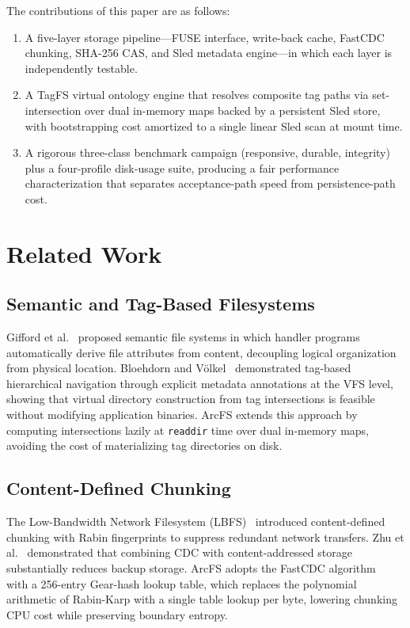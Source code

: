 \documentclass[conference]{IEEEtran}
\begin{document}
The contributions of this paper are as follows:
\begin{enumerate}
\item A five-layer storage pipeline—FUSE interface, write-back cache,
  FastCDC chunking, SHA-256 CAS, and Sled metadata engine—in which
  each layer is independently testable.
\item A TagFS virtual ontology engine that resolves composite tag paths
  via set-intersection over dual in-memory maps backed by a persistent
  Sled store, with bootstrapping cost amortized to a single linear Sled
  scan at mount time.
\item A rigorous three-class benchmark campaign (responsive, durable,
  integrity) plus a four-profile disk-usage suite, producing a fair
  performance characterization that separates acceptance-path speed from
  persistence-path cost.
\end{enumerate}

\section{Related Work}

\subsection{Semantic and Tag-Based Filesystems}

Gifford et al.~\cite{gifford1991semantic} proposed semantic file systems
in which handler programs automatically derive file attributes from content,
decoupling logical organization from physical location. Bloehdorn and
V\"{o}lkel~\cite{bloehdorn2006tagfs} demonstrated tag-based hierarchical
navigation through explicit metadata annotations at the VFS level, showing
that virtual directory construction from tag intersections is feasible
without modifying application binaries. ArcFS extends this approach by
computing intersections lazily at \texttt{readdir} time over dual in-memory
maps, avoiding the cost of materializing tag directories on disk.

\subsection{Content-Defined Chunking}

The Low-Bandwidth Network Filesystem (LBFS)~\cite{muthitacharoen2001lbfs}
introduced content-defined chunking with Rabin fingerprints to suppress
redundant network transfers. Zhu et al.~\cite{zhu2008dedup} demonstrated
that combining CDC with content-addressed storage substantially reduces
backup storage. ArcFS adopts the FastCDC algorithm~\cite{xia2016fastcdc}
with a 256-entry Gear-hash lookup table, which replaces the polynomial
arithmetic of Rabin-Karp with a single table lookup per byte, lowering
chunking CPU cost while preserving boundary entropy.
\end{document}
